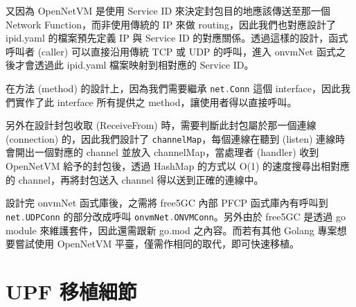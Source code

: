 又因為 OpenNetVM 是使用 Service ID 來決定封包目的地應該傳送至那一個 Network Function，而非使用傳統的 IP 來做 routing，因此我們也對應設計了 ipid.yaml 的檔案預先定義 IP 與 Service ID 的對應關係。透過這樣的設計，函式呼叫者 (caller) 可以直接沿用傳統 TCP 或 UDP 的呼叫，進入 onvmNet 函式之後才會透過此 ipid.yaml 檔案映射到相對應的 Service ID。

在方法 (method) 的設計上，因為我們需要繼承 \lstinline[language=Go]{net.Conn} 這個 interface，因此我們實作了此 interface 所有提供之 method，讓使用者得以直接呼叫。

另外在設計封包收取 (ReceiveFrom) 時，需要判斷此封包屬於那一個連線 (connection) 的，因此我們設計了 \lstinline{channelMap}，每個連線在聽到 (listen) 連線時會開出一個對應的 channel 並放入 channelMap，當處理者 (handler) 收到 OpenNetVM 給予的封包後，透過 HashMap 的方式以 O(1) 的速度搜尋出相對應的 channel，再將封包送入 channel 得以送到正確的連線中。

設計完 onvmNet 函式庫後，之需將 free5GC 內部 PFCP 函式庫內有呼叫到 \lstinline[language=Go]{net.UDPConn} 的部分改成呼叫 \lstinline[language=Go]{onvmNet.ONVMConn}。另外由於 free5GC 是透過 go module 來維護套件，因此還需跟新 go.mod 之內容。而若有其他 Golang 專案想要嘗試使用 OpenNetVM 平臺，僅需作相同的取代，即可快速移植。

\section{UPF 移植細節}
\label{sec:upf_porting}
